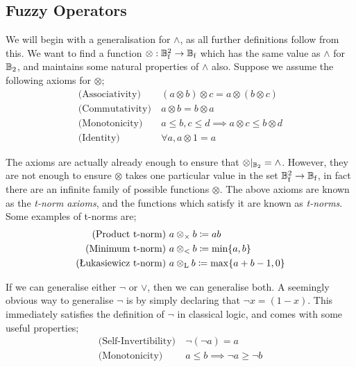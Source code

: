 \subsection{Fuzzy Operators}

\def\prodand{\custop{\otimes_\times}}
\def\minand{\custop{\otimes_<}}
\def\lukand{\custop{\otimes_\text{L}}}
\def\draand{\custop{\otimes_\text{D}}}

\def\prodor{\custop{\oplus_\times}}
\def\minor{\custop{\oplus_<}}
\def\lukor{\custop{\oplus_\text{L}}}

We will begin with a generalisation for $\land$, as all further definitions follow from this. We want to find a function $\otimes : \mathbb{B}_\text{f}^2 \to \mathbb{B}_\text{f}$ which has the same value as $\land$ for $\mathbb{B}_2$, and maintains some natural properties of $\land$ also. Suppose we assume the following axioms for $\otimes$;
$$
\begin{aligned}
\text{(Associativity)}&\ (a \otimes b) \otimes c = a \otimes (b \otimes c) \\
\text{(Commutativity)}&\ a \otimes b = b \otimes a \\
\text{(Monotonicity)}&\ a \leq b, c \leq d \implies a \otimes c \leq b \otimes d \\
\text{(Identity)}&\ \forall a, a \otimes 1 = a
\end{aligned}
$$
 
The axioms are actually already enough to ensure that $\otimes |_{\mathbb{B}_2} = \land$. However, they are not enough to ensure $\otimes$ takes one particular value in the set $\mathbb{B}_\text{f}^2 \to \mathbb{B}_\text{f}$, in fact there are an infinite family of possible functions $\otimes$. The above axioms are known as the \textit{t-norm axioms}, and the functions which satisfy it are known as \textit{t-norms}. Some examples of t-norms are;
$$
\begin{aligned}
    \text{(Product t-norm)}&\ a \prodand b \coloneqq ab \\
    \text{(Minimum t-norm)}&\ a \minand b \coloneqq \min\{a,b\} \\
    \text{(Łukasiewicz t-norm)}&\ a \lukand b \coloneqq \max\{a+b-1,0\}
\end{aligned}
$$

If we can generalise either $\lnot$ or $\lor$, then we can generalise both. A seemingly obvious way to generalise $\lnot$ is by simply declaring that $\lnot x = (1 - x)$. This immediately satisfies the definition of $\lnot$ in classical logic, and comes with some useful properties;
$$
\begin{aligned}
\text{(Self-Invertibility)}&\ \lnot(\lnot a) = a \\
\text{(Monotonicity)}&\ a \leq b \implies \lnot a \geq \lnot b \\
\end{aligned}
$$

